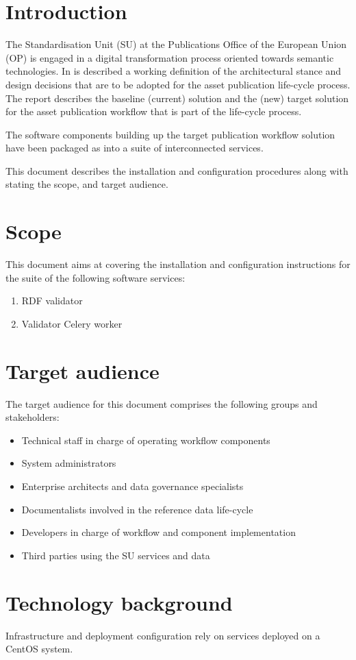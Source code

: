 \section{Introduction}
\label{sec:introduction}

The Standardisation Unit (SU) at the Publications Office of the European Union (OP) is engaged in a digital transformation process oriented towards semantic technologies. In \citep{costetchi2020d} is described a working definition of the architectural stance and design decisions that are to be adopted for the asset publication life-cycle process. The report describes the baseline (current) solution and the (new) target solution for the asset publication workflow that is part of the life-cycle process. 

The software components building up the target publication workflow solution have been packaged as into a suite of interconnected services.

This document describes the installation and configuration procedures along with stating the scope, and target audience.

\section{Scope}
\label{sec:scope}

This document aims at covering the installation and configuration instructions for the suite of the following software services:

\begin{enumerate}
	\item RDF validator
	\item Validator Celery worker
\end{enumerate}

\section{Target audience}
\label{sec:audience}

The target audience for this document comprises the following groups and stakeholders:	
\begin{itemize}
	\item Technical staff in charge of operating workflow components
	\item System administrators
	\item Enterprise architects and data governance specialists
	\item Documentalists involved in the reference data life-cycle
	\item Developers in charge of workflow and component implementation
	\item Third parties using the SU services and data
\end{itemize}

\section{Technology background}
\label{sec:background}

Infrastructure and deployment configuration rely on services deployed on a CentOS system.